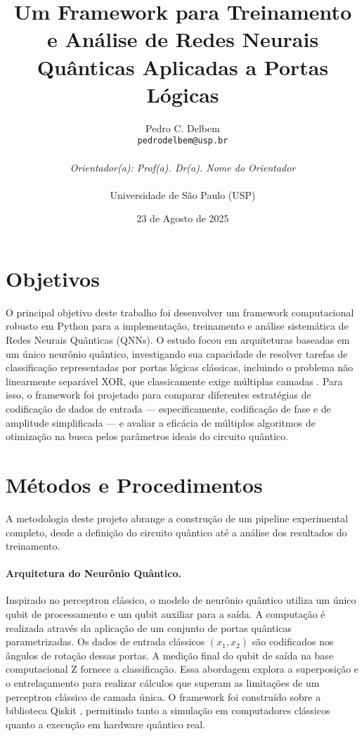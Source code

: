 \documentclass[12pt, a4paper]{article}
\title{\textbf{Um Framework para Treinamento e Análise de Redes Neurais Quânticas Aplicadas a Portas Lógicas}}
\author{
  Pedro C. Delbem \\
  \texttt{pedrodelbem@usp.br} \\
  \\
  \textit{Orientador(a): Prof(a). Dr(a). Nome do Orientador} \\
  \\
  Universidade de São Paulo (USP)
}
\date{23 de Agosto de 2025}
\begin{document}
\maketitle
\thispagestyle{empty}
\newpage

\section*{Objetivos}

O principal objetivo deste trabalho foi desenvolver um framework computacional robusto em Python para a implementação, treinamento e análise sistemática de Redes Neurais Quânticas (QNNs). O estudo focou em arquiteturas baseadas em um único neurônio quântico, investigando sua capacidade de resolver tarefas de classificação representadas por portas lógicas clássicas, incluindo o problema não linearmente separável XOR, que classicamente exige múltiplas camadas \cite{grossu2021, minsky1969}. Para isso, o framework foi projetado para comparar diferentes estratégias de codificação de dados de entrada — especificamente, codificação de fase e de amplitude simplificada — e avaliar a eficácia de múltiplos algoritmos de otimização na busca pelos parâmetros ideais do circuito quântico.

\section*{Métodos e Procedimentos}

A metodologia deste projeto abrange a construção de um pipeline experimental completo, desde a definição do circuito quântico até a análise dos resultados do treinamento.

\paragraph{Arquitetura do Neurônio Quântico.}
Inspirado no perceptron clássico, o modelo de neurônio quântico utiliza um único qubit de processamento e um qubit auxiliar para a saída. A computação é realizada através da aplicação de um conjunto de portas quânticas parametrizadas. Os dados de entrada clássicos $(x_{1}, x_{2})$ são codificados nos ângulos de rotação dessas portas. A medição final do qubit de saída na base computacional Z fornece a classificação. Essa abordagem explora a superposição e o entrelaçamento para realizar cálculos que superam as limitações de um perceptron clássico de camada única. O framework foi construído sobre a biblioteca Qiskit \cite{qiskit}, permitindo tanto a simulação em computadores clássicos quanto a execução em hardware quântico real.
\end{document}
